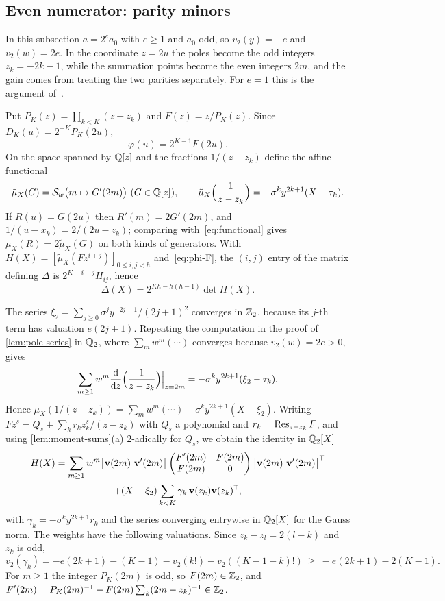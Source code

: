 \subsection{Even numerator: parity minors}\label{subsec:two-even}

In this subsection $a=2^ea_0$ with $e\ge1$ and $a_0$ odd, so $v_2(y)=-e$ and $v_2(w)=2e$. In
the coordinate $z=2u$ the poles become the odd integers $z_k=-2k-1$, while the summation points
become the even integers $2m$, and the gain comes from treating the two parities separately.
For $e=1$ this is the argument of~\cite[\S3]{AxiomForge2026numeratorTwo}.

Put $P_K(z)=\prod_{k<K}(z-z_k)$ and $F(z)=z/P_K(z)$. Since $D_K(u)=2^{-K}P_K(2u)$,
\begin{equation}\label{eq:phi-F}
  \varphi(u)=2^{K-1}F(2u).
\end{equation}
On the space spanned by $\mathbb{Q}[z]$ and the fractions $1/(z-z_k)$ define the affine functional
\[
  \tilde\mu_X(G)=\mom\bigl(m\mapsto G'(2m)\bigr)\ (G\in\Q[z]),\qquad
  \tilde\mu_X\Bigl(\frac1{z-z_k}\Bigr)=-\sigma^ky^{2k+1}(X-\tau_k).
\]
If $R(u)=G(2u)$ then $R'(m)=2G'(2m)$, and $1/(u-x_k)=2/(2u-z_k)$; comparing
with~\eqref{eq:functional} gives $\mu_X(R)=2\tilde\mu_X(G)$ on both kinds of generators. With
$H(X)=[\tilde\mu_X(Fz^{i+j})]_{0\le i,j<h}$ and~\eqref{eq:phi-F}, the $(i,j)$ entry of the matrix
defining $\Delta$ is $2^{K-i-j}H_{ij}$, hence
\begin{equation}\label{eq:Delta-H}
  \Delta(X)=2^{Kh-h(h-1)}\det H(X).
\end{equation}

The series $\xi_2=\sum_{j\ge0}\sigma^jy^{-2j-1}/(2j+1)^2$ converges in $\mathbb{Z}_2$, because its
$j$-th term has valuation $e(2j+1)$. Repeating the computation in the proof of
\cref{lem:pole-series} in $\mathbb{Q}_2$, where $\sum_mw^m(\cdots)$ converges because $v_2(w)=2e>0$,
gives
\[
  \sum_{m\ge1}w^m\frac{\mathrm d}{\mathrm dz}\Bigl(\frac1{z-z_k}\Bigr)\Big|_{z=2m}
  =-\sigma^ky^{2k+1}(\xi_2-\tau_k).
\]
Hence $\tilde\mu_X(1/(z-z_k))=\sum_mw^m(\cdots)-\sigma^ky^{2k+1}(X-\xi_2)$. Writing
$Fz^s=Q_s+\sum_kr_kz_k^s/(z-z_k)$ with $Q_s$ a polynomial and $r_k=\operatorname*{Res}_{z=z_k}F$, and using
\cref{lem:moment-sums}(a) $2$-adically for $Q_s$, we obtain the identity in $\mathbb{Q}_2[X]$
\begin{multline}\label{eq:H-two-adic}
  H(X)=\sum_{m\ge1}w^m\bigl[\mathbf{v}(2m)\ \mathbf{v}'(2m)\bigr]
  \begin{pmatrix}F'(2m)&F(2m)\\F(2m)&0\end{pmatrix}
  \bigl[\mathbf{v}(2m)\ \mathbf{v}'(2m)\bigr]^{\mathsf T}\\
  +(X-\xi_2)\sum_{k<K}\gamma_k\,\mathbf{v}(z_k)\mathbf{v}(z_k)^{\mathsf T},
\end{multline}
with $\gamma_k=-\sigma^ky^{2k+1}r_k$ and the series converging entrywise in $\mathbb{Q}_2[X]$ for the
Gauss norm. The weights have the following valuations. Since $z_k-z_l=2(l-k)$ and $z_k$ is odd,
\begin{equation}\label{eq:gamma-two}
  v_2(\gamma_k)=-e(2k+1)-(K-1)-v_2(k!)-v_2((K-1-k)!)\ \ge\ -e(2k+1)-2(K-1) .
\end{equation}
For $m\ge1$ the integer $P_K(2m)$ is odd, so $F(2m)\in\mathbb{Z}_2$, and
$F'(2m)=P_K(2m)^{-1}-F(2m)\sum_k(2m-z_k)^{-1}\in\mathbb{Z}_2$.

